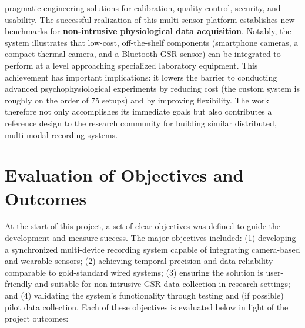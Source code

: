 \documentclass[11pt,a4paper]{report}
\begin{document}
pragmatic engineering solutions for calibration, quality control,
security, and usability. The successful realization of this multi-sensor
platform establishes new benchmarks for \textbf{non-intrusive physiological
data acquisition}. Notably, the system illustrates that low-cost,
off-the-shelf components (smartphone cameras, a compact thermal camera,
and a Bluetooth GSR sensor) can be integrated to perform at a level
approaching specialized laboratory equipment. This achievement has
important implications: it lowers the barrier to conducting advanced
psychophysiological experiments by reducing cost (the custom system is
roughly on the order of 75%
setups) and by improving flexibility. The work therefore not only
accomplishes its immediate goals but also contributes a reference design
to the research community for building similar distributed, multi-modal
recording systems.

\section{Evaluation of Objectives and Outcomes}

At the start of this project, a set of clear objectives was defined to
guide the development and measure success. The major objectives
included: (1) developing a synchronized multi-device recording system
capable of integrating camera-based and wearable sensors; (2) achieving
temporal precision and data reliability comparable to gold-standard
wired systems; (3) ensuring the solution is user-friendly and suitable
for non-intrusive GSR data collection in research settings; and (4)
validating the system's functionality through testing and (if possible)
pilot data collection. Each of these objectives is evaluated below in
light of the project outcomes:
\end{document}

